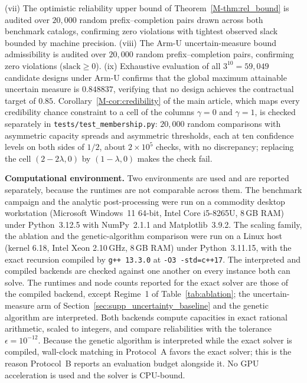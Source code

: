 \documentclass[11pt]{article}
\newcommand{\new}[1]{#1}
\begin{document}
(vii) The optimistic reliability upper bound of Theorem~\ref*{M-thm:rel_bound} is audited over $20{,}000$ random prefix--completion pairs drawn across both benchmark catalogs, confirming zero violations with tightest observed slack bounded by machine precision.
(viii) The Arm-U uncertain-measure bound admissibility is audited over $20{,}000$ random prefix--completion pairs, confirming zero violations ($\text{slack} \ge 0$).
(ix) Exhaustive evaluation of all $3^{10} = 59{,}049$ candidate designs under Arm-U confirms that the global maximum attainable uncertain measure is $0.848837$, verifying that no design achieves the contractual target of $0.85$.
Corollary~\ref*{M-cor:credibility} of the main article, which maps every credibility chance constraint to a cell of the columns
$\gamma=0$ and $\gamma=1$, is checked separately in \texttt{tests/test\_membership.py}: $20{,}000$ random
comparisons with asymmetric capacity spreads and asymmetric thresholds, each at ten confidence levels on
both sides of $1/2$, about $2\times10^5$ checks, with no discrepancy; replacing the cell $(2-2\lambda,0)$
by $(1-\lambda,0)$ makes the check fail.

\textbf{Computational environment.} Two environments are used and are reported separately, because the
runtimes are not comparable across them. The benchmark campaign and the analytic post-processing were
run on a commodity desktop workstation (Microsoft Windows~11 64-bit, Intel Core i5-8265U, 8\,GB RAM)
under Python~3.12.5 with NumPy~2.1.1 and Matplotlib~3.9.2. The scaling family, the
ablation and the genetic-algorithm comparison were run on a Linux host (kernel 6.18, Intel Xeon
2.10\,GHz, 8\,GB RAM) under Python~3.11.15, with the exact recursion compiled by
\texttt{g++~13.3.0} at \texttt{-O3 -std=c++17}. The interpreted and compiled backends are checked
against one another on every instance both can solve. \new{The runtimes and node counts reported for the exact solver are those of the compiled backend, except Regime~1 of Table~\ref{tab:ablation}; the uncertain-measure arm of Section~\ref{sec:supp_uncertainty_baseline} and the genetic algorithm are interpreted. Both backends compute capacities in exact rational arithmetic, scaled to integers, and compare reliabilities with the tolerance $\epsilon = 10^{-12}$.} Because the genetic algorithm is interpreted
while the exact solver is compiled, wall-clock matching in Protocol~A favors the exact solver; this is
the reason Protocol~B reports an evaluation budget alongside it. No GPU acceleration is used and the
solver is CPU-bound.
\end{document}
